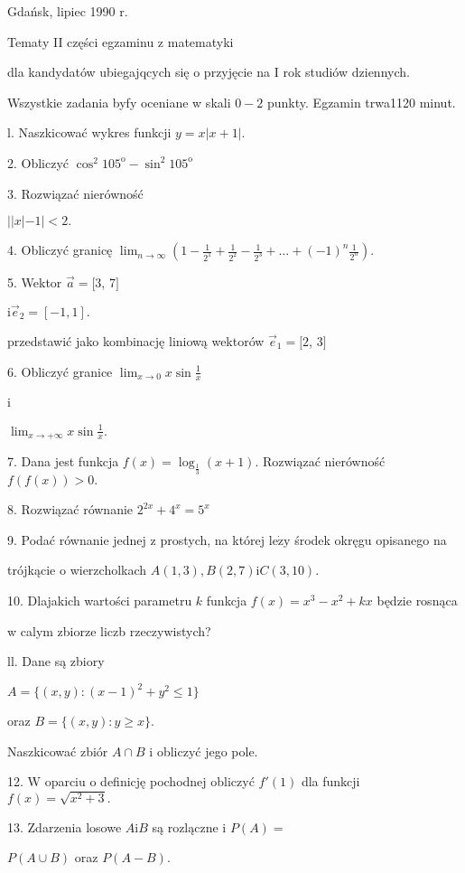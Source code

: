 \documentclass[a4paper,12pt]{article}
\begin{document}
Gdańsk, lipiec 1990 r.

Tematy II części egzaminu z matematyki

dla kandydatów ubiegajqcych się o przyjęcie na I rok studiów dziennych.

Wszystkie zadania byfy oceniane w skali $0-2$ punkty. Egzamin trwa1120 minut.

l. Naszkicować wykres funkcji $y=x|x+1|.$

2. Obliczyć $\cos^{2}105^{\mathrm{o}}-\sin^{2}105^{\mathrm{o}}$

3. Rozwiązać nierówność

$||x|-1|<2.$

4. Obliczyć granicę $\displaystyle \lim_{n\rightarrow\infty}(1-\frac{1}{2^{1}}+\frac{1}{2^{2}}-\frac{1}{2^{3}}+\ldots+(-1)^{n}\frac{1}{2^{n}}).$

5. Wektor $\vec{a}=[3$, 7$]$

$\mathrm{i}\vec{e}_{2}=[-1,1].$

przedstawić jako kombinację liniową wektorów $\vec{e}_{1}=[2$, 3$]$

6. Obliczyć granice $\displaystyle \lim_{x\rightarrow 0}x\sin\frac{1}{x}$

i

$\displaystyle \lim_{x\rightarrow+\infty}x\sin\frac{1}{x}.$

7. Dana jest funkcja $f(x)=\log_{\frac{1}{3}}(x+1)$. Rozwiązać nierówność $f(f(x))>0.$

8. Rozwiązać równanie $2^{2x}+4^{x}=5^{x}$

9. Podać równanie jednej z prostych, na której $\mathrm{l}\mathrm{e}\dot{\mathrm{z}}\mathrm{y}$ środek okręgu opisanego na

trójkącie o wierzcholkach $A(1,3), B(2,7)\mathrm{i}C(3,10).$

10. Dlajakich wartości parametru $k$ funkcja $f(x)=x^{3}-x^{2}+kx$ będzie rosnąca

w calym zbiorze liczb rzeczywistych?

ll. Dane są zbiory

$A=\{(x,y):(x-1)^{2}+y^{2}\leq 1\}$

oraz $B=\{(x,y):y\geq x\}.$

Naszkicować zbiór $A\cap B$ i obliczyć jego pole.

12. $\mathrm{W}$ oparciu o definicję pochodnej obliczyć $f'(1)$ dla funkcji $f(x)=\sqrt{x^{2}+3}.$

13. Zdarzenia losowe $A \mathrm{i} B$ są rozlączne i $P(A) =$

$P(A\cup B)$ oraz $P(A-B).$
\end{document}
